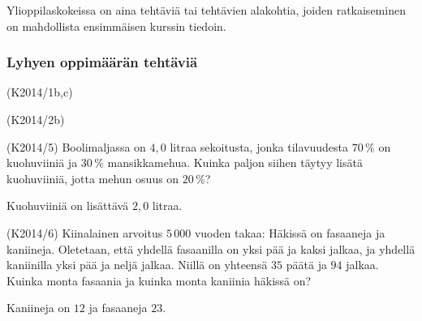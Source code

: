 Ylioppilaskokeissa on aina tehtäviä tai tehtävien alakohtia, joiden ratkaiseminen on mahdollista ensimmäisen kurssin tiedoin.


\subsubsection*{Lyhyen oppimäärän tehtäviä}

\begin{tehtava} (K2014/1b,c) 
    \begin{vastaus}
    \end{vastaus}	
\end{tehtava}

\begin{tehtava}(K2014/2b)
    \begin{vastaus}
    \end{vastaus}	
\end{tehtava}

\begin{tehtava} (K2014/5) Boolimaljassa on $4,0$ litraa sekoitusta, jonka tilavuudesta $70\,\%$ on kuohuviiniä ja $30\,\%$ mansikkamehua. Kuinka paljon siihen täytyy lisätä kuohuviiniä, jotta mehun osuus on $20\,\%$?
    \begin{vastaus}
	    Kuohuviiniä on lisättävä $2,0$ litraa.
    \end{vastaus}
\end{tehtava}

\begin{tehtava} (K2014/6) Kiinalainen arvoitus $5\,000$ vuoden takaa: Häkissä on fasaaneja ja kaniineja. Oletetaan, että yhdellä fasaanilla on yksi pää ja kaksi jalkaa, ja yhdellä kaniinilla yksi pää ja neljä jalkaa. Niillä on yhteensä $35$ päätä ja $94$ jalkaa. Kuinka monta fasaania ja kuinka monta kaniinia häkissä on?
	\begin{vastaus}
		Kaniineja on $12$ ja fasaaneja $23$.
	\end{vastaus}
\end{tehtava}


